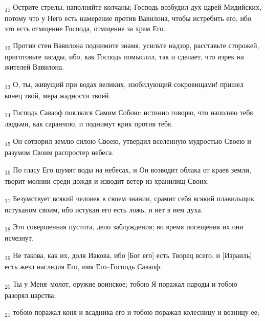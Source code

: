 \begin{tcolorbox}
\textsubscript{11} Острите стрелы, наполняйте колчаны; Господь возбудил дух царей Мидийских, потому что у Него есть намерение против Вавилона, чтобы истребить его, ибо это есть отмщение Господа, отмщение за храм Его.
\end{tcolorbox}
\begin{tcolorbox}
\textsubscript{12} Против стен Вавилона поднимите знамя, усильте надзор, расставьте сторожей, приготовьте засады, ибо, как Господь помыслил, так и сделает, что изрек на жителей Вавилона.
\end{tcolorbox}
\begin{tcolorbox}
\textsubscript{13} О, ты, живущий при водах великих, изобилующий сокровищами! пришел конец твой, мера жадности твоей.
\end{tcolorbox}
\begin{tcolorbox}
\textsubscript{14} Господь Саваоф поклялся Самим Собою: истинно говорю, что наполню тебя людьми, как саранчою, и поднимут крик против тебя.
\end{tcolorbox}
\begin{tcolorbox}
\textsubscript{15} Он сотворил землю силою Своею, утвердил вселенную мудростью Своею и разумом Своим распростер небеса.
\end{tcolorbox}
\begin{tcolorbox}
\textsubscript{16} По гласу Его шумят воды на небесах, и Он возводит облака от краев земли, творит молнии среди дождя и изводит ветер из хранилищ Своих.
\end{tcolorbox}
\begin{tcolorbox}
\textsubscript{17} Безумствует всякий человек в своем знании, срамит себя всякий плавильщик истуканом своим, ибо истукан его есть ложь, и нет в нем духа.
\end{tcolorbox}
\begin{tcolorbox}
\textsubscript{18} Это совершенная пустота, дело заблуждения; во время посещения их они исчезнут.
\end{tcolorbox}
\begin{tcolorbox}
\textsubscript{19} Не такова, как их, доля Иакова, ибо [Бог его] есть Творец всего, и [Израиль] есть жезл наследия Его, имя Его--Господь Саваоф.
\end{tcolorbox}
\begin{tcolorbox}
\textsubscript{20} Ты у Меня--молот, оружие воинское; тобою Я поражал народы и тобою разорял царства;
\end{tcolorbox}
\begin{tcolorbox}
\textsubscript{21} тобою поражал коня и всадника его и тобою поражал колесницу и возницу ее;
\end{tcolorbox}
